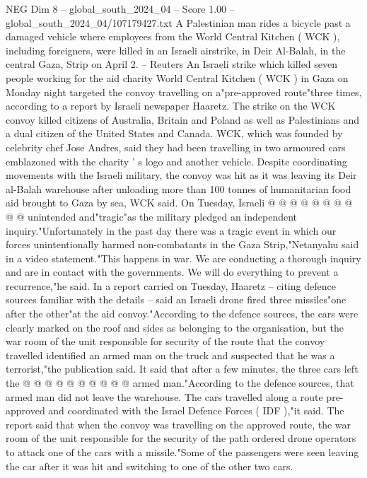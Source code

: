\begin{textsample}{NEG Dim 8 – global\_south\_2024\_04 – Score 1.00 – global\_south\_2024\_04/107179427.txt}  \label{ex:f8_neg_270}
A Palestinian man rides a bicycle past a damaged vehicle where employees from the World Central Kitchen ( WCK ), including foreigners, were killed in an Israeli airstrike, in Deir Al-Balah, in the central Gaza, Strip on April 2. -- Reuters An Israeli strike which killed seven people working for the aid charity World Central Kitchen ( WCK ) in Gaza on Monday night targeted the convoy travelling on a"pre-approved route"three times, according to a report by Israeli newspaper Haaretz.
The strike on the WCK convoy killed citizens of Australia, Britain and Poland as well as Palestinians and a dual citizen of the United States and Canada.
WCK, which was founded by celebrity chef Jose Andres, said they had been travelling in two armoured cars emblazoned with the charity ' s logo and another vehicle.
Despite coordinating movements with the Israeli military, the convoy was hit as it was leaving its Deir al-Balah warehouse after unloading more than 100 tonnes of humanitarian food aid brought to Gaza by sea, WCK said.
On Tuesday, Israeli @ @ @ @ @ @ @ @ @ @ unintended and"tragic"as the military pledged an independent inquiry."Unfortunately in the past day there was a tragic event in which our forces unintentionally harmed non-combatants in the Gaza Strip,"Netanyahu said in a video statement."This happens in war.
We are conducting a thorough inquiry and are in contact with the governments.
We will do everything to prevent a recurrence,"he said.
In a report carried on Tuesday, Haaretz -- citing defence sources familiar with the details -- said an Israeli drone fired three missiles"one after the other"at the aid convoy."According to the defence sources, the cars were clearly marked on the roof and sides as belonging to the organisation, but the war room of the unit responsible for security of the route that the convoy travelled identified an armed man on the truck and suspected that he was a terrorist,"the publication said.
It said that after a few minutes, the three cars left the @ @ @ @ @ @ @ @ @ @ armed man."According to the defence sources, that armed man did not leave the warehouse.
The cars travelled along a route pre-approved and coordinated with the Israel Defence Forces ( IDF ),"it said.
The report said that when the convoy was travelling on the approved route, the war room of the unit responsible for the security of the path ordered drone operators to attack one of the cars with a missile."Some of the passengers were seen leaving the car after it was hit and switching to one of the other two cars.

\end{textsample}
